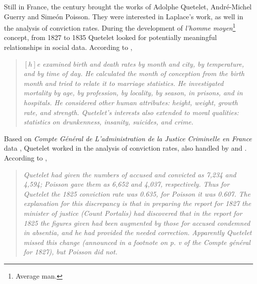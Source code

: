 \documentclass[a4paper]{exam}
\theoremstyle{plain}
\begin{document}
Still in France, the  century brought the works of Adolphe Quetelet, André-Michel Guerry and Simeón Poisson. They were interested in Laplace's work, as well in the analysis of conviction rates. During the development of \textit{l'homme moyen}\footnote{ Average man.} concept, from 1827 to 1835 Quetelet looked for potentially meaningful relationships in social data. According to \cite{stigler1986history},

\begin{quote}
\textit{$\left[h\right]$e examined birth and death rates by month and city, by temperature, and by time of day. He calculated the month of conception from the birth month and tried to relate it to marriage statistics. He investigated mortality by age, by profession, by locality, by season, in prisons, and in hospitals. He considered other human attributes: height, weight, growth rate, and strength. Quetelet's interests also extended to moral qualities: statistics on drunkenness, insanity, suicides, and crime.} \cite[p. 186]{stigler1986history}
\end{quote}

Based on \textit{Compte Général de L'administration de la Justice Criminelle en France} data \cite{france1829compte}, Quetelet worked in the analysis of conviction rates, also handled by \cite{guerry1833essai} and \cite{poisson1837recherches}. According to \cite{stigler1986history},

\begin{quote}
\textit{Quetelet had given the numbers of accused and convicted as 7,234 and 4,594; Poisson gave them as 6,652 and 4,037, respectively. Thus for Quetelet the 1825 conviction rate was 0.635, for Poisson it was 0.607. The explanation for this discrepancy is that in preparing the report for 1827 the minister of justice (Count Portalis) had discovered that in the report for 1825 the figures given had been augmented by those for accused condemned in absentia, and he had provided the needed correction. Apparently Quetelet missed this change (announced in a footnote on p. v of the Compte général for 1827), but Poisson did not.} \cite[p. 188]{stigler1986history}
\end{quote}
\end{document}
